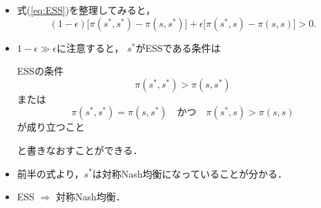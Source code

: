 \documentclass[uplatex,12pt,dvipdfmx,xcolor=svgnames]{beamer}
\begin{document}
\begin{frame}[t]{\secIV}
	
\begin{itemize}
	\item 式(\ref{eq:ESS})を整理してみると，
		\begin{equation*}
			(1-\epsilon)\Big[\pi(s^*, s^*) - \pi(s, s^*)\Big]
			+\epsilon\Big[\pi(s^*, s) - \pi(s, s)\Big]
			>0.
		\end{equation*}
	\item $1-\epsilon\gg\epsilon$に注意すると，	$s^*$がESSである条件は
		\begin{block}{ESSの条件}
			\begin{equation}
				\pi(s^*, s^*) > \pi(s, s^*)
				\label{eq2}
			\end{equation}
			または
			\begin{equation}
				\pi(s^*, s^*) = \pi(s, s^*)
				\quad\text{かつ}\quad
				\pi(s^*, s) > \pi(s, s)
				\label{eq3}
			\end{equation}
			が成り立つこと
		\end{block}
		と書きなおすことができる．
	\item 前半の式より，$s^*$は対称Nash均衡になっていることが分かる．
	\item ESS $\Longrightarrow$ 対称Nash均衡．
\end{itemize}
	
\end{frame}
\end{document}
